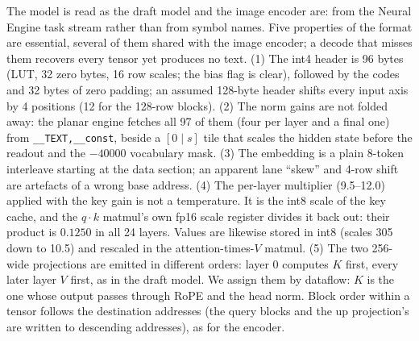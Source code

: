 \documentclass[11pt,reqno]{amsart}
\makeatletter
\newcommand{\code}[1]{\texttt{#1}}
\renewcommand\paragraph{\@startsection{paragraph}{4}\z@{.6\linespacing\@plus.2\linespacing}{-\fontdimen2\font}{\normalfont\bfseries}}
\theoremstyle{definition}
\makeatother
\begin{document}
\paragraph{Decoding.} The model is read as the draft model and the image encoder are: from the Neural Engine task stream rather than from symbol names. Five properties of the format are essential, several of them shared with the image encoder; a decode that misses them recovers every tensor yet produces no text. (1) The int4 header is 96 bytes (LUT, 32 zero bytes, 16 row scales; the bias flag is clear), followed by the codes and 32 bytes of zero padding; an assumed 128-byte header shifts every input axis by 4 positions (12 for the 128-row blocks). (2) The norm gains are not folded away: the planar engine fetches all 97 of them (four per layer and a final one) from \code{\_\_TEXT,\_\_const}, beside a $[0\mid s]$ tile that scales the hidden state before the readout and the $-40000$ vocabulary mask. (3) The embedding is a plain 8-token interleave starting at the data section; an apparent lane ``skew'' and 4-row shift are artefacts of a wrong base address. (4) The per-layer multiplier (9.5--12.0) applied with the key gain is not a temperature. It is the int8 scale of the key cache, and the $q\!\cdot\!k$ matmul's own fp16 scale register divides it back out: their product is $0.1250$ in all 24 layers. Values are likewise stored in int8 (scales 305 down to 10.5) and rescaled in the attention-times-$V$ matmul. (5) The two 256-wide projections are emitted in different orders: layer 0 computes $K$ first, every later layer $V$ first, as in the draft model. We assign them by dataflow: $K$ is the one whose output passes through RoPE and the head norm. Block order within a tensor follows the destination addresses (the query blocks and the up projection's are written to descending addresses), as for the encoder.
\end{document}
